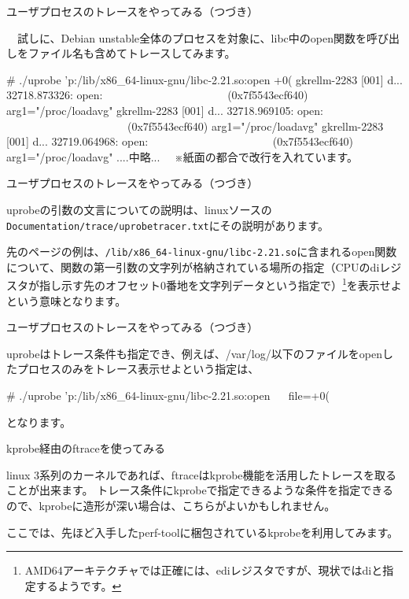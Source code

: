 \begin{frame}[containsverbatim]{ユーザプロセスのトレースをやってみる（つづき）}

　試しに、Debian unstable全体のプロセスを対象に、libc中のopen関数を呼び出しをファイル名も含めてトレースしてみます。

 \begin{commandline}
   # ./uprobe 'p:/lib/x86_64-linux-gnu/libc-2.21.so:open
   +0(%
   gkrellm-2283  [001] d... 32718.873326: open:
   　　　　　　　　　　　(0x7f5543ecf640) arg1="/proc/loadavg"
   gkrellm-2283  [001] d... 32718.969105: open:
   　　　　　　　　　　　(0x7f5543ecf640) arg1="/proc/loadavg"
   gkrellm-2283  [001] d... 32719.064968: open:
   　　　　　　　　　　　(0x7f5543ecf640) arg1="/proc/loadavg"
	 ....中略...
　※紙面の都合で改行を入れています。
 \end{commandline}
\end{frame}  

\begin{frame}[containsverbatim]{ユーザプロセスのトレースをやってみる（つづき）}

 uprobeの引数の文言についての説明は、linuxソースの\verb+Documentation/trace/uprobetracer.txt+にその説明があります。

 先のページの例は、\verb+/lib/x86_64-linux-gnu/libc-2.21.so+に含まれるopen関数について、関数の第一引数の文字列が格納されている場所の指定（CPUのdiレジスタが指し示す先のオフセット0番地を文字列データという指定で）\footnote{AMD64アーキテクチャでは正確には、ediレジスタですが、現状ではdiと指定するようです。}を表示せよという意味となります。
 
\end{frame}  

\begin{frame}[containsverbatim]{ユーザプロセスのトレースをやってみる（つづき）}

 uprobeはトレース条件も指定でき、例えば、/var/log/以下のファイルをopenしたプロセスのみをトレース表示せよという指定は、
\begin{commandline}
  # ./uprobe 'p:/lib/x86_64-linux-gnu/libc-2.21.so:open
  　 file=+0(%
\end{commandline}

となります。

\end{frame}  

\begin{frame}[containsverbatim]{kprobe経由のftraceを使ってみる}

  linux 3系列のカーネルであれば、ftraceはkprobe機能を活用したトレースを取ることが出来ます。
トレース条件にkprobeで指定できるような条件を指定できるので、kprobeに造形が深い場合は、こちらがよいかもしれません。

  ここでは、先ほど入手したperf-toolに梱包されているkprobeを利用してみます。
  
\end{frame}  


